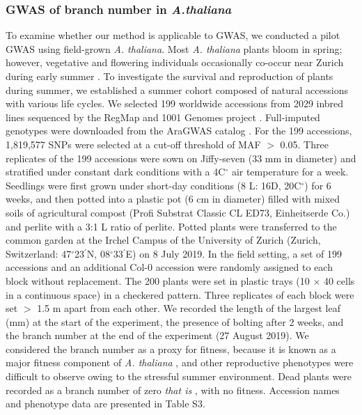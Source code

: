 \documentclass[12pt,]{article}
\begin{document}
\subsubsection{GWAS of branch number in \textit{A.thaliana}}
To examine whether our method is applicable to GWAS, we conducted a pilot GWAS using field-grown \textit{A. thaliana}. Most \textit{A. thaliana} plants bloom in spring; however, vegetative and flowering individuals occasionally co-occur near Zurich during early summer \citep{sato2019plant}. To investigate the survival and reproduction of plants during summer, we established a summer cohort composed of natural accessions with various life cycles. We selected 199 worldwide accessions from 2029 inbred lines sequenced by the RegMap \citep{horton_genome-wide_2012} and 1001 Genomes project \citep{alonso-blanco_1135_2016}. Full-imputed genotypes were downloaded from the AraGWAS catalog \citep{togninalli_aragwas_2018}. For the 199 accessions, 1,819,577 SNPs were selected at a cut-off threshold of MAF $>$ 0.05. Three replicates of the 199 accessions were sown on Jiffy-seven (33 mm in diameter) and stratified under constant dark conditions with a 4C$^{\circ}$ air temperature for a week. Seedlings were first grown under short-day conditions (8 L: 16D, 20C$^{\circ}$) for 6 weeks, and then potted into a plastic pot (6 cm in diameter) filled with mixed soils of agricultural compost (Profi Substrat Classic CL ED73, Einheitserde Co.) and perlite with a 3:1 L ratio of perlite. Potted plants were transferred to the common garden at the Irchel Campus of the University of Zurich (Zurich, Switzerland: 47$^\circ$23$^\prime$N, 08$^\circ$33$^\prime$E) on 8 July 2019. In the field setting, a set of 199 accessions and an additional Col-0 accession were randomly assigned to each block without replacement. The 200 plants were set in plastic trays (10 $\times$ 40 cells in a continuous space) in a checkered pattern. Three replicates of each block were set $>$ 1.5 m apart from each other. We recorded the length of the largest leaf (mm) at the start of the experiment, the presence of bolting after 2 weeks, and the branch number at the end of the experiment (27 August 2019). We considered the branch number as a proxy for fitness, because it is known as a major fitness component of \textit{A. thaliana} \citep{chong2018note}, and other reproductive phenotypes were difficult to observe owing to the stressful summer environment. Dead plants were recorded as a branch number of zero \textit{ that is }, with no fitness. Accession names and phenotype data are presented in Table S3.
\end{document}
